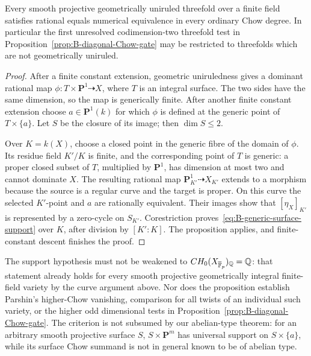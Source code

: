 \begin{corollary}
\label{cor:B-uniruled-threefold}
Every smooth projective geometrically uniruled threefold over a
finite field satisfies rational equals numerical equivalence in
every ordinary Chow degree.  In particular the first unresolved
codimension-two threefold test in
Proposition~\ref{prop:B-diagonal-Chow-gate} may be restricted to
threefolds which are not geometrically uniruled.
\end{corollary}
\begin{proof}
After a finite constant extension, geometric uniruledness gives a
dominant rational map \(\phi:T\times\mathbf P^1\dashrightarrow X\),
where \(T\) is an integral surface.  The two sides have the same
dimension, so the map is generically finite.  After another finite
constant extension choose \(a\in\mathbf P^1(k)\) for which
\(\phi\) is defined at the generic point of \(T\times\{a\}\).
Let \(S\) be the closure of its image; then \(\dim S\leq2\).

Over \(K=k(X)\), choose a closed point in the generic fibre of
the domain of \(\phi\).  Its residue field \(K'/K\) is finite,
and the corresponding point of \(T\) is generic: a proper closed
subset of \(T\), multiplied by \(\mathbf P^1\), has dimension
at most two and cannot dominate \(X\).  The resulting rational
map \(\mathbf P^1_{K'}\dashrightarrow X_{K'}\) extends to a
morphism because the source is a regular curve and the target is
proper.  On this curve the selected \(K'\)-point and \(a\) are
rationally equivalent.  Their images show that
\([\eta_X]_{K'}\) is represented by a zero-cycle on \(S_{K'}\).
Corestriction proves~\eqref{eq:B-generic-surface-support} over
\(K\), after division by \([K':K]\).  The proposition applies,
and finite-constant descent finishes the proof.
\end{proof}

The support hypothesis must not be weakened to
\(CH_0(X_{\overline{\mathbb F}_p})_{\mathbb Q}=\mathbb Q\): that statement already
holds for every smooth projective geometrically integral
finite-field variety by the curve argument above.  Nor does the
proposition establish Parshin's higher-Chow vanishing, comparison
for all twists of an individual such variety, or the higher odd
dimensional tests in Proposition~\ref{prop:B-diagonal-Chow-gate}.
The criterion is not subsumed by our abelian-type theorem: for an
arbitrary smooth projective surface \(S\), \(S\times\mathbf P^m\)
has universal support on \(S\times\{a\}\), while its surface
Chow summand is not in general known to be of abelian type.
